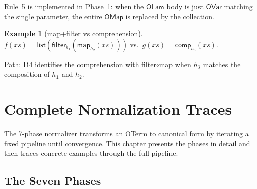 \documentclass[11pt,a4paper]{report}
\theoremstyle{definition}
\newtheorem{example}[definition]{Example}
\theoremstyle{plain}
\begin{document}
Rule~5 is implemented in Phase~1: when the $\mathsf{OLam}$ body is just
$\mathsf{OVar}$ matching the single parameter, the entire
$\mathsf{OMap}$ is replaced by the collection.

\begin{example}[map+filter vs comprehension]
$f(xs) = \mathsf{list}(\mathsf{filter}_{h_1}(\mathsf{map}_{h_2}(xs)))$
vs.\ $g(xs) = \mathsf{comp}_{h_3}(xs)$.

Path: D4 identifies the comprehension with filter$\circ$map when
$h_3$ matches the composition of $h_1$ and $h_2$.
\end{example}


\chapter{Complete Normalization Traces}
\label{ch:traces}

The 7-phase normalizer transforms an OTerm to canonical form by
iterating a fixed pipeline until convergence.  This chapter presents
the phases in detail and then traces concrete examples through the
full pipeline.

\section{The Seven Phases}
\end{document}
